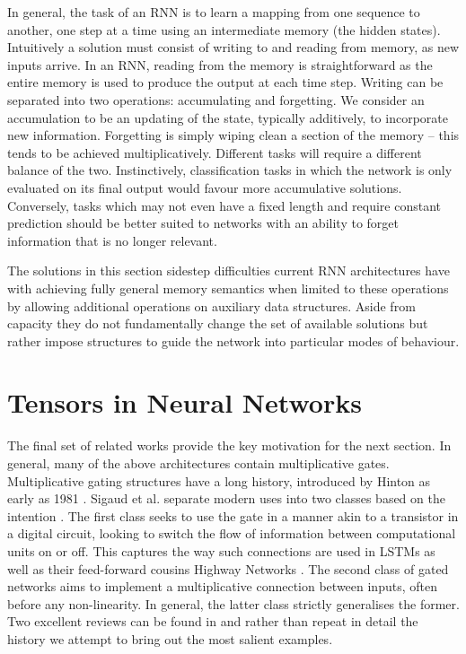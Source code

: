 In
general, the task of an RNN is to learn a mapping from one sequence to another, one step at
a time using an intermediate memory (the hidden states). Intuitively a solution must consist of
writing to and reading from memory, as new inputs arrive. In an RNN, reading from the memory is
straightforward as the entire memory is used to produce the output at each time
step. Writing can be separated into two operations: accumulating
and forgetting.
We consider an accumulation to be an updating of the state, typically additively, to incorporate
new information. Forgetting is simply wiping clean a section of the memory -- this tends to be
achieved multiplicatively. Different tasks will require a different balance of the two. Instinctively,
classification tasks in which the network is only evaluated on its final output would favour
more accumulative solutions. Conversely, tasks which may not even have a fixed length and
require constant prediction should be better suited to networks with an ability to forget information
that is no longer relevant.

The solutions in this section sidestep difficulties current RNN architectures have with
achieving fully general memory semantics when limited to these operations by allowing additional
operations on auxiliary data structures. Aside from capacity they
do not fundamentally change the set of available solutions but rather impose structures to guide
the network into particular modes of behaviour.

\section{Tensors in Neural Networks}
The final set of related works provide the key motivation for the next section. In general, many of
the above architectures contain multiplicative gates. Multiplicative gating structures have a long
history,
introduced by Hinton as early as 1981 \autocite{Hinton1981}. Sigaud et al. separate modern uses into
two classes based on the intention \autocite{Sigaud2015}. The first class
seeks to use the gate in a manner akin to a transistor in a digital circuit, looking to switch the
flow of information between computational units on or off. This captures the way such connections are
used in LSTMs as well as their feed-forward cousins Highway Networks \autocite{Srivastava2015}. The
second class of gated networks aims to implement a multiplicative connection between inputs, often
before any non-linearity. In general, the
latter class strictly generalises the former. Two excellent reviews can be
found in \autocite{Memisevic2011, Sigaud2015} and rather than repeat in detail the history we
attempt to bring out the most salient examples.

